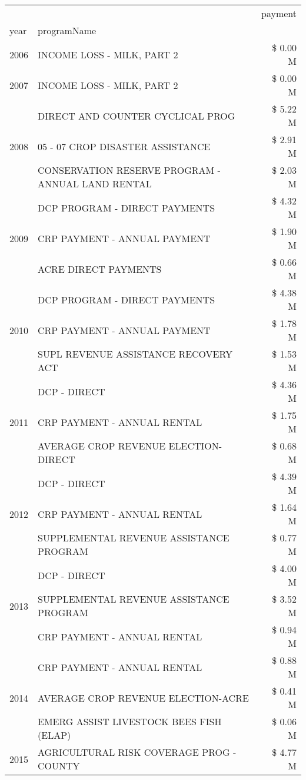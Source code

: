 \begin{tabular}{llr}
\toprule
 &  & payment \\
year & programName &  \\
\midrule
2006 & INCOME LOSS - MILK, PART 2 & \$ 0.00 M \\
\cline{1-3}
2007 & INCOME LOSS - MILK, PART 2 & \$ 0.00 M \\
\cline{1-3}
\multirow[t]{3}{*}{2008} & DIRECT AND COUNTER CYCLICAL PROG & \$ 5.22 M \\
 & 05 - 07 CROP DISASTER ASSISTANCE & \$ 2.91 M \\
 & CONSERVATION RESERVE PROGRAM - ANNUAL LAND RENTAL & \$ 2.03 M \\
\cline{1-3}
\multirow[t]{3}{*}{2009} & DCP PROGRAM - DIRECT PAYMENTS & \$ 4.32 M \\
 & CRP PAYMENT - ANNUAL PAYMENT & \$ 1.90 M \\
 & ACRE DIRECT PAYMENTS & \$ 0.66 M \\
\cline{1-3}
\multirow[t]{3}{*}{2010} & DCP PROGRAM - DIRECT PAYMENTS & \$ 4.38 M \\
 & CRP PAYMENT - ANNUAL PAYMENT & \$ 1.78 M \\
 & SUPL REVENUE ASSISTANCE RECOVERY ACT & \$ 1.53 M \\
\cline{1-3}
\multirow[t]{3}{*}{2011} & DCP - DIRECT & \$ 4.36 M \\
 & CRP PAYMENT - ANNUAL RENTAL & \$ 1.75 M \\
 & AVERAGE CROP REVENUE ELECTION-DIRECT & \$ 0.68 M \\
\cline{1-3}
\multirow[t]{3}{*}{2012} & DCP - DIRECT & \$ 4.39 M \\
 & CRP PAYMENT - ANNUAL RENTAL & \$ 1.64 M \\
 & SUPPLEMENTAL REVENUE ASSISTANCE PROGRAM & \$ 0.77 M \\
\cline{1-3}
\multirow[t]{3}{*}{2013} & DCP - DIRECT & \$ 4.00 M \\
 & SUPPLEMENTAL REVENUE ASSISTANCE PROGRAM & \$ 3.52 M \\
 & CRP PAYMENT - ANNUAL RENTAL & \$ 0.94 M \\
\cline{1-3}
\multirow[t]{3}{*}{2014} & CRP PAYMENT - ANNUAL RENTAL & \$ 0.88 M \\
 & AVERAGE CROP REVENUE ELECTION-ACRE & \$ 0.41 M \\
 & EMERG ASSIST LIVESTOCK BEES FISH (ELAP) & \$ 0.06 M \\
\cline{1-3}
\multirow[t]{3}{*}{2015} & AGRICULTURAL RISK COVERAGE PROG - COUNTY & \$ 4.77 M \\

\end{tabular}
